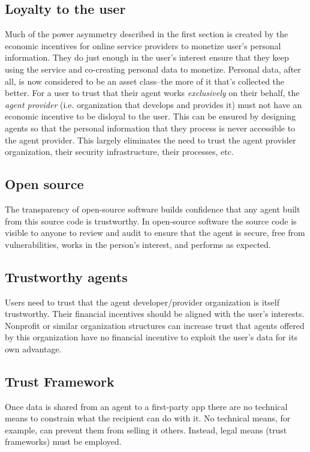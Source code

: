 \documentclass[11pt, oneside]{article}   	%
\begin{document}
\subsection{Loyalty to the user}
Much of the power asymmetry described in the first section is created by the economic incentives for online service providers to monetize user's personal information. They do just enough in the user's interest ensure that they keep using the service and co-creating personal data to monetize. Personal data, after all, is now considered to be an asset class--the more of it that's collected the better. For a user to trust that their agent works \emph{exclusively} on their behalf, the \emph{agent provider} (i.e. organization that develops and provides it) must not have an economic incentive to be disloyal to the user. This can be ensured by designing agents so that the personal information that they process is never accessible to the agent provider. This largely eliminates the need to trust the agent provider organization, their security infrastructure, their processes, etc.

\subsection{Open source}

The transparency of open-source software builds confidence that any agent built from this source code is trustworthy. In open-source software the source code is visible to anyone to review and audit to ensure that the agent is secure, free from vulnerabilities, works in the person's interest, and performs as expected.

\subsection{Trustworthy agents}

Users need to trust that the agent developer/provider organization is itself trustworthy. Their financial incentives should be aligned with the user's interests. Nonprofit or similar organization structures can increase trust that agents offered by this organization have no financial incentive to exploit the user's data for its own advantage. 

\subsection{Trust Framework}

Once data is shared from an agent to a first-party app there are no technical means to constrain what the recipient can do with it. No technical means, for example, can prevent them from selling it others. Instead, legal means (trust frameworks) must be employed. 
\end{document}

